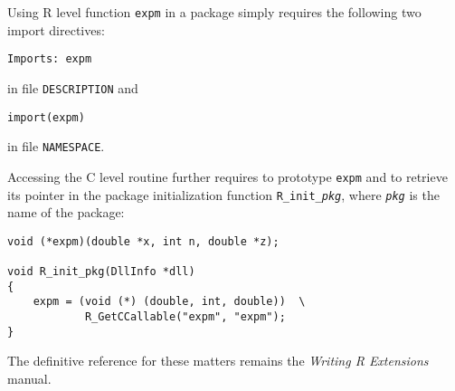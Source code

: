 \documentclass{article}
\newcommand{\code}[1]{\texttt{#1}}
\newcommand{\proglang}[1]{\textsf{#1}}
\begin{document}
Using \proglang{R} level function \code{expm} in a package simply
requires the following two import directives:
\begin{verbatim}
Imports: expm
\end{verbatim}
in file \code{DESCRIPTION} and
\begin{verbatim}
import(expm)
\end{verbatim}
in file \code{NAMESPACE}.

Accessing the \proglang{C} level routine further requires to prototype
\code{expm} and to retrieve its pointer in the package initialization
function \code{R\_init\_\textit{pkg}}, where \code{\textit{pkg}} is
the name of the package:
\begin{verbatim}
void (*expm)(double *x, int n, double *z);

void R_init_pkg(DllInfo *dll)
{
    expm = (void (*) (double, int, double))  \
            R_GetCCallable("expm", "expm");
}
\end{verbatim}

The definitive reference for these matters remains the \emph{Writing R
Extensions} manual.


\end{document}
